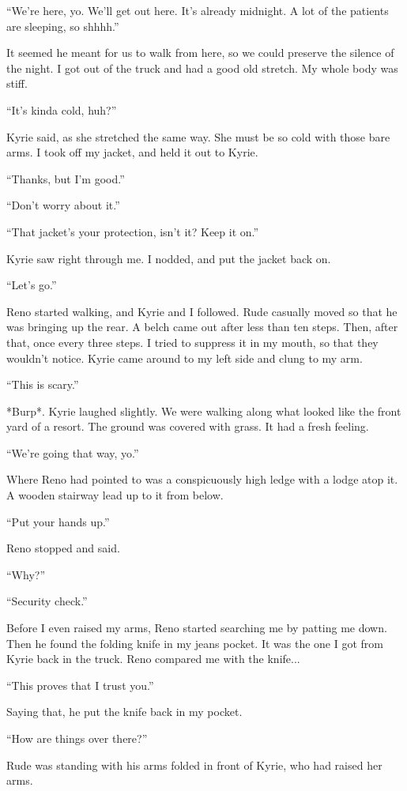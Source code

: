 \documentclass[oneside]{book}
\begin{document}
“We’re here, yo. We’ll get out here. It’s already midnight. A lot of the patients are sleeping, so shhhh.”

It seemed he meant for us to walk from here, so we could preserve the silence of the night. I got out of the truck and had a good old stretch. My whole body was stiff.

“It’s kinda cold, huh?”

Kyrie said, as she stretched the same way. She must be so cold with those bare arms. I took off my jacket, and held it out to Kyrie.

“Thanks, but I’m good.”

“Don’t worry about it.”

“That jacket’s your protection, isn’t it? Keep it on.”

Kyrie saw right through me. I nodded, and put the jacket back on.

“Let’s go.”

Reno started walking, and Kyrie and I followed. Rude casually moved so that he was bringing up the rear. A belch came out after less than ten steps. Then, after that, once every three steps. I tried to suppress it in my mouth, so that they wouldn’t notice. Kyrie came around to my left side and clung to my arm.

“This is scary.”

*Burp*. Kyrie laughed slightly. We were walking along what looked like the front yard of a resort. The ground was covered with grass. It had a fresh feeling.

“We’re going that way, yo.”

Where Reno had pointed to was a conspicuously high ledge with a lodge atop it. A wooden stairway lead up to it from below.

“Put your hands up.”

Reno stopped and said.

“Why?”

“Security check.”

Before I even raised my arms, Reno started searching me by patting me down. Then he found the folding knife in my jeans pocket. It was the one I got from Kyrie back in the truck. Reno compared me with the knife...

“This proves that I trust you.”

Saying that, he put the knife back in my pocket.

“How are things over there?”

Rude was standing with his arms folded in front of Kyrie, who had raised her arms.
\end{document}
